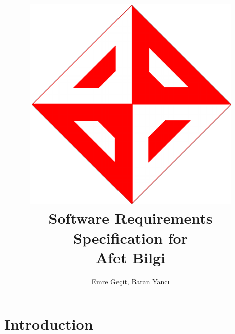 \documentclass[12pt]{article}
\author{Emre Geçit, Baran Yancı}
\begin{document}
\title{\includegraphics[scale=0.2]{ceng_400x400.png}\\ Software Requirements Specification for \\  \textbf{Afet Bilgi}}
\maketitle
\tableofcontents
\section{Introduction}
\end{document}
